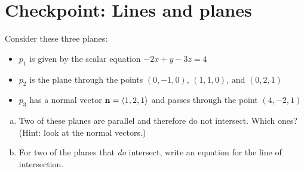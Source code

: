 

%


\allowdisplaybreaks
\section{Checkpoint: Lines and planes }
Consider these three planes:

\begin{itemize}
    \item $p_1$ is given by the scalar equation $-2x + y - 3z = 4$
    \item $p_2$ is the plane through the points $(0, -1, 0)$, $(1,1,0)$, and $(0,2,1)$
    \item $p_3$ has a normal vector $\mathbf{n} = \langle 1, 2, 1\rangle$ and passes through the point $(4, -2, 1)$
\end{itemize}

\begin{enumerate}[(a)]
    \item Two of these planes are parallel and therefore do not intersect. Which ones? \\(Hint: look at the normal vectors.)
    \item For two of the planes that \textit{do} intersect, write an equation for the line of intersection.
\end{enumerate}




	
